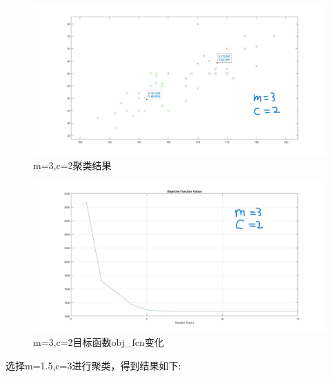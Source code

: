 \documentclass{article}
\begin{document}
\begin{figure}[H]
    \centering
    \includegraphics[width=1\textwidth]{image/Figure12_1.jpg}
    \caption{m=3,c=2聚类结果}
    \label{Figure12_1}
\end{figure}
\begin{figure}[H]
    \centering
    \includegraphics[width=1\textwidth]{image/Figure12_2.jpg}
    \caption{m=3,c=2目标函数obj\_fcn变化}
    \label{Figure12_2}
\end{figure}


选择m=1.5,c=3进行聚类，得到结果如下:
\end{document}
